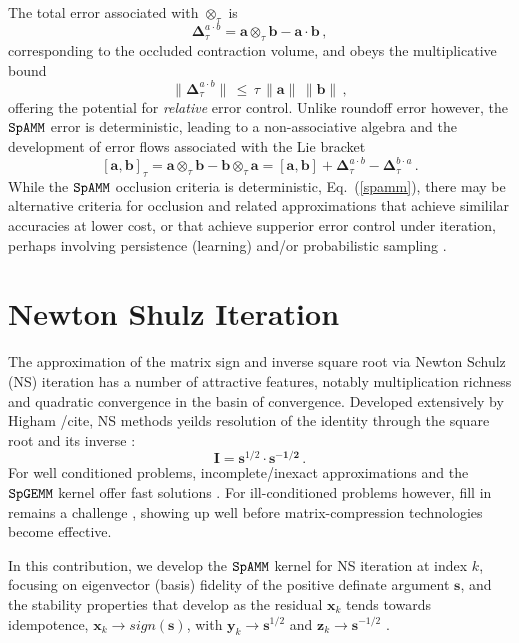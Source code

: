 \documentclass[letterpaper,twocolumn,amsmath,amsfont,amssymb,english,aps,jcp,preprintnumbers,groupaddress,nofootinbib,tightenlines]{revtex4}
\newcommand{\mat}[1]{\boldsymbol{#1}}
\newcommand{\ot}{ {\scriptstyle \otimes}_{ \tau } }
\begin{document}
The total error associated with $\ot$ is 
\begin{equation}
\mat{\Delta}^{a\cdot b}_{\tau}=\mat{a} \ot \mat{b}-\mat{a}\cdot \mat{b} \, ,
\end{equation}
corresponding to the occluded contraction volume, and obeys the multiplicative bound 
\begin{equation}
\lVert \mat{\Delta}^{a \cdot b}_{\tau} \rVert \, \leq \, \tau \, \lVert \mat{a} \rVert  \,  \lVert \mat{b} \rVert \, ,
\end{equation}
offering the potential for {\em relative} error control.  Unlike roundoff error however, the $\tt SpAMM$ error is deterministic,
leading to a non-associative algebra and the development of error flows associated with the Lie bracket
\begin{equation}
\left[ \mat{a} , \mat{b} \right]_{\tau} = \mat{a} \ot \mat{b}-\mat{b} \ot \mat{a}  
=  \left[ \mat{a} , \mat{b} \right]
+ \mat{\Delta}^{a\cdot b}_{\tau} -\mat{\Delta}^{b\cdot a}_{\tau} \,.
\end{equation}
While the $\tt SpAMM$ occlusion criteria is deterministic, Eq.~(\ref{spamm}), 
there may be alternative criteria for occlusion and related approximations that 
achieve simililar accuracies at lower cost, or that achieve supperior error control under iteration, 
perhaps involving persistence (learning) and/or probabilistic sampling \cite{Drineas}.  

\section{Newton Shulz Iteration}

The approximation of the matrix sign and inverse square root via Newton Schulz (NS) iteration 
has a number of attractive features, notably multiplication richness and quadratic convergence in the basin of convergence. 
Developed extensively by Higham /cite{}, NS methods yeilds resolution of the identity through the square root and its inverse \cite{}:
\begin{equation}
\mat{I}=\mat{s}^{1/2} \cdot \mat{s^{-1/2}} \, .
\end{equation}
For well conditioned problems, incomplete/inexact approximations and the $\tt SpGEMM$ kernel offer fast solutions \cite{}.
For ill-conditioned problems however, fill in remains a challenge \cite{}, showing up well before matrix-compression 
technologies become effective.   

In this contribution, we develop the $\tt SpAMM$ kernel for NS iteration at index $k$, focusing on eigenvector (basis) fidelity of the
positive definate argument $\mat{s}$, and the stability properties that develop as the residual $\mat{x}_k $ tends towards 
idempotence, $\mat{x}_k \rightarrow {sign}\left( \mat{s} \right) $, with 
 $\mat{y}_k \rightarrow \mat{s}^{1/2}$  and $\mat{z}_k \rightarrow \mat{s}^{-1/2}$ \cite{higham}.
\end{document}
